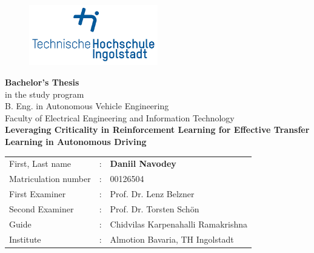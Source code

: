

\begin{titlepage}	
		\begin{figure}[!h]
			\centering
			\includegraphics[width={0.5\textwidth}]{images/thiRGB.jpg}	
		\end{figure}																			
	
	\begin{center}
		\hrulefill 
	\end{center}
	
	
	\begin{center}	
		\vspace{1cm}
		
		\huge\textbf{
			Bachelor's Thesis}\\[1em]
		\normalsize
			in the study program \\ B. Eng. in Autonomous Vehicle Engineering\\ Faculty of Electrical Engineering and Information Technology\\ [8em]
	
		\Large\textbf{Leveraging Criticality in Reinforcement Learning for Effective Transfer Learning in Autonomous Driving}	 \\ [10em]

	\end{center}
	
	
	\begin{tabular}{lll}
		First, Last name &:& \textbf{Daniil Navodey}	\\ [1em]
		
		Matriculation number &:& 00126504 \\[3em]
		
		First Examiner &:& Prof. Dr. Lenz Belzner	\\ [1em]
		Second Examiner &:& Prof. Dr. Torsten Schön	\\ [2em]
		
		Guide &:& Chidvilas Karpenahalli Ramakrishna \\[3em]
		
		Institute &:& Almotion Bavaria, TH Ingolstadt \\
	\end{tabular}
	
\end{titlepage}

\restoregeometry